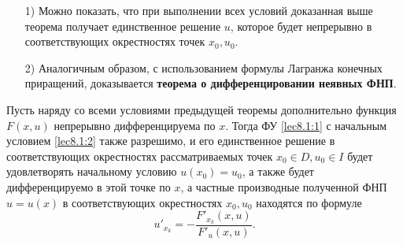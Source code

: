 \documentclass[../../main.tex]{subfiles}
\begin{document}
	 \begin{rems}
	 \;
		 \begin{itemize}
		 	 \item[1)] Можно показать, что при выполнении всех условий 
		 	 доказанная выше теорема получает единственное решение $u$, 
		 	 которое будет непрерывно в соответствующих окрестностях точек 
		 	 $x_0, u_0$.

			 \item[2)] Аналогичным образом, с использованием формулы Лагранжа 
			 конечных приращений, доказывается \textbf{теорема о 
			 дифференцировании неявных ФНП}.
		\end{itemize}

		Пусть наряду со всеми условиями предыдущей теоремы дополнительно 
		функция $F(x, u)$ непрерывно дифференцируема по $x$. Тогда ФУ 
		\eqref{lec8.1:1} с начальным условием \eqref{lec8.1:2} также разрешимо, 
		и его единственное решение в соответствующих окрестностях 
		рассматриваемых точек $x_0 \in D, u_0 \in I$ будет удовлетворять 
		начальному условию $u(x_0)=u_0$, а также будет дифференцируемо в 
		этой точке по $x$, а частные производные полученной ФНП $u = u(x)$ в 
		соответствующих окрестностях $x_0, u_0$ находятся по формуле
		\begin{equation}
			u'_{x_k} = -\frac{F'_{x_k}(x,u)}{F'_u(x,u)}. \label{lec8.1:6}
		\end{equation}
	\end{rems}
\end{document}
